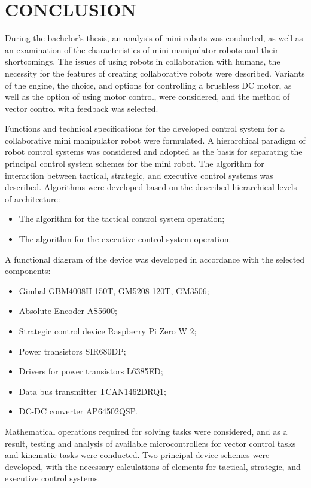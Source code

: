 
\section*{\centering CONCLUSION}
During the bachelor's thesis, an analysis of mini robots was conducted, as well as an examination of the characteristics of mini manipulator robots and their shortcomings. The issues of using robots in collaboration with humans, the necessity for the features of creating collaborative robots were described. Variants of the engine, the choice, and options for controlling a brushless DC motor, as well as the option of using motor control, were considered, and the method of vector control with feedback was selected.

Functions and technical specifications for the developed control system for a collaborative mini manipulator robot were formulated. A hierarchical paradigm of robot control systems was considered and adopted as the basis for separating the principal control system schemes for the mini robot. The algorithm for interaction between tactical, strategic, and executive control systems was described. Algorithms were developed based on the described hierarchical levels of architecture:
\begin{itemize}
	\item The algorithm for the tactical control system operation;
	\item The algorithm for the executive control system operation.
\end{itemize}
A functional diagram of the device was developed in accordance with the selected components:
\begin{itemize}
	\item Gimbal GBM4008H-150T, GM5208-120T, GM3506;
	\item Absolute Encoder AS5600;
	\item Strategic control device Raspberry Pi Zero W 2;
	\item Power transistors SIR680DP;
	\item Drivers for power transistors L6385ED;
	\item Data bus transmitter TCAN1462DRQ1;
	\item DC-DC converter AP64502QSP.
\end{itemize}
Mathematical operations required for solving tasks were considered, and as a result, testing and analysis of available microcontrollers for vector control tasks and kinematic tasks were conducted. Two principal device schemes were developed, with the necessary calculations of elements for tactical, strategic, and executive control systems.
